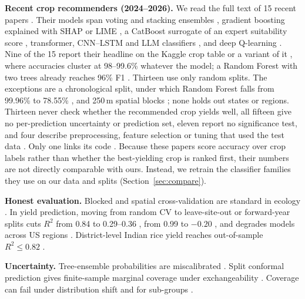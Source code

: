 \documentclass[conference]{IEEEtran}
\begin{document}
\textbf{Recent crop recommenders (2024--2026).} We read the full text of 15 recent papers
\cite{dey2024,senapaty2024,sam2025,ahmed2025,afzal2025,shastri2025,singh2025,gunasekaran2025,bakr2025,piyar2026,mahesh2026,latha2026,reddy2026,sharma2026,pandey2026}. Their models span voting and stacking ensembles \cite{ahmed2025,afzal2025,gunasekaran2025},
gradient boosting explained with SHAP or LIME \cite{shastri2025,sharma2026}, a CatBoost surrogate of an expert
suitability score \cite{mahesh2026}, transformer, CNN--LSTM and LLM classifiers \cite{bakr2025,piyar2026,latha2026,pandey2026},
and deep Q-learning \cite{reddy2026}. Nine of the 15 report their headline on the Kaggle crop table
\cite{ingle2020kaggle} or a variant of it \cite{dey2024,ahmed2025,afzal2025,shastri2025,gunasekaran2025,bakr2025,piyar2026,latha2026,pandey2026}, where accuracies cluster at 98--99.6\% whatever the model;
a Random Forest with two trees already reaches 96\% F1 \cite{afzal2025}. Thirteen use only random
splits. The exceptions are a chronological split, under which Random Forest falls from 99.96\% to 78.55\% \cite{sam2025},
and 250\,m spatial blocks \cite{reddy2026}; none holds out states or regions. Thirteen never check whether
the recommended crop yields well, all fifteen give no per-prediction uncertainty or prediction set,
eleven report no significance test, and four describe preprocessing, feature
selection or tuning that used the test data \cite{singh2025,piyar2026,latha2026,reddy2026}. Only one links its code
\cite{reddy2026}. Because these papers score accuracy over crop labels rather than whether the best-yielding crop
is ranked first, their numbers are not directly comparable with ours. Instead, we retrain the classifier families they use
on our data and splits (Section~\ref{sec:compare}).

\textbf{Honest evaluation.} Blocked and spatial cross-validation are standard in ecology
\cite{roberts2017,meyer2019}. In yield prediction, moving from random CV to leave-site-out or
forward-year splits cuts $R^2$ from 0.84 to 0.29--0.36 \cite{zhang2026}, from 0.99 to $-0.20$
\cite{asif2026}, and degrades models across US regions \cite{chakravarty2025}. District-level Indian
rice yield reaches out-of-sample $R^2\le0.82$ \cite{declercq2024}.

\textbf{Uncertainty.} Tree-ensemble probabilities are miscalibrated \cite{niculescumizil2005}.
Split conformal prediction gives finite-sample marginal coverage under exchangeability
\cite{angelopoulos2021,sadinle2019,romano2020}. Coverage can fail under distribution shift
\cite{barber2023} and for sub-groups \cite{melki2023}.
\end{document}
